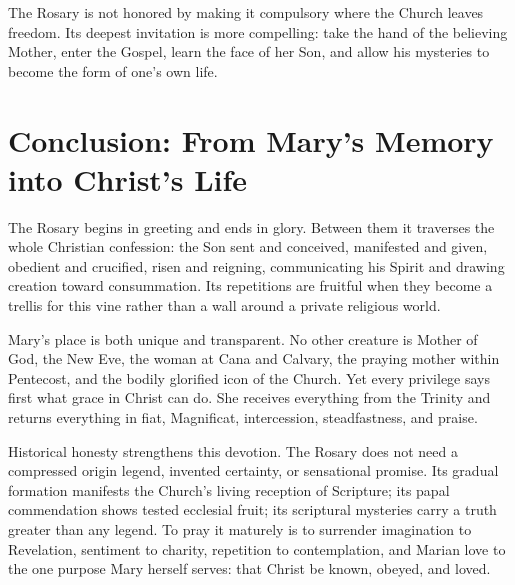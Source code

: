 The Rosary is not honored by making it compulsory where the Church leaves freedom. Its deepest invitation is more compelling: take the hand of the believing Mother, enter the Gospel, learn the face of her Son, and allow his mysteries to become the form of one's own life.

\section{Conclusion: From Mary's Memory into Christ's Life}

The Rosary begins in greeting and ends in glory. Between them it traverses the whole Christian confession: the Son sent and conceived, manifested and given, obedient and crucified, risen and reigning, communicating his Spirit and drawing creation toward consummation. Its repetitions are fruitful when they become a trellis for this vine rather than a wall around a private religious world.

Mary's place is both unique and transparent. No other creature is Mother of God, the New Eve, the woman at Cana and Calvary, the praying mother within Pentecost, and the bodily glorified icon of the Church. Yet every privilege says first what grace in Christ can do. She receives everything from the Trinity and returns everything in fiat, Magnificat, intercession, steadfastness, and praise.

Historical honesty strengthens this devotion. The Rosary does not need a compressed origin legend, invented certainty, or sensational promise. Its gradual formation manifests the Church's living reception of Scripture; its papal commendation shows tested ecclesial fruit; its scriptural mysteries carry a truth greater than any legend. To pray it maturely is to surrender imagination to Revelation, sentiment to charity, repetition to contemplation, and Marian love to the one purpose Mary herself serves: that Christ be known, obeyed, and loved.
